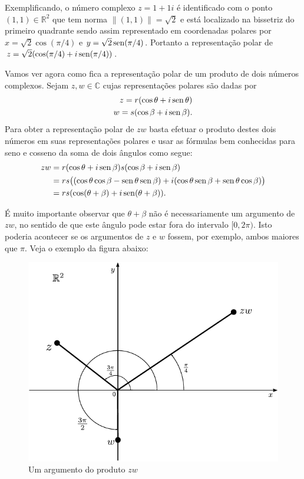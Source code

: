 Exemplificando, o número complexo $z=1+1i$ é identificado com o ponto $(1,1)\in\mathbb{R}^2$
que tem norma $\|(1,1)\|=\sqrt{2}$ e está localizado na bissetriz do primeiro quadrante 
sendo assim representado em coordenadas polares 
por $x=\sqrt{2}\cos(\pi/4)$ e $y=\sqrt{2}\operatorname{sen}(\pi/4)$.
Portanto a representação polar de $z=\sqrt{2}(\cos(\pi/4)+i\operatorname{sen}(\pi/4))$.


Vamos ver agora como fica a representação polar de um produto de dois números
complexos. Sejam $z,w\in\mathbb{C}$ cujas representações polares são dadas por
\begin{align*}
z = r(\cos\theta+i\operatorname{sen}\theta)\\
w = s(\cos\beta+i\operatorname{sen}\beta).
\end{align*}
Para obter a representação polar de $zw$ basta efetuar o produto destes dois números
em suas representações polares e usar as fórmulas bem conhecidas para seno e cosseno
da soma de dois ângulos como segue:
\begin{align}\label{eq-formula-prod-zw-coord-polares}
zw
&=
r(\cos\theta+i\operatorname{sen}\beta)s(\cos\beta+i\operatorname{sen}\beta)
\nonumber\\
&=
rs \big( (\cos\theta\cos\beta-\operatorname{sen}\theta\operatorname{sen}\beta) +i(\cos\theta\operatorname{sen}\beta+\operatorname{sen}\theta\cos\beta)\big)
\nonumber\\
&=
rs (\cos(\theta+\beta)+i\operatorname{sen}(\theta+\beta)).
\end{align}

É muito importante observar que $\theta+\beta$ não é necessariamente um argumento 
de $zw$, no sentido de que este ângulo pode estar fora do intervalo $[0,2\pi)$.
Isto poderia acontecer se os argumentos de $z$ e $w$ fossem, por exemplo, ambos
maiores que $\pi$. Veja o exemplo da figura abaixo:
\begin{figure}[h]
\centering
\includegraphics[scale=0.9]{Figuras/fig-prod-argumento}
\caption{Um argumento do produto $zw$}
\label{fig-coord-polares2}
\end{figure}

